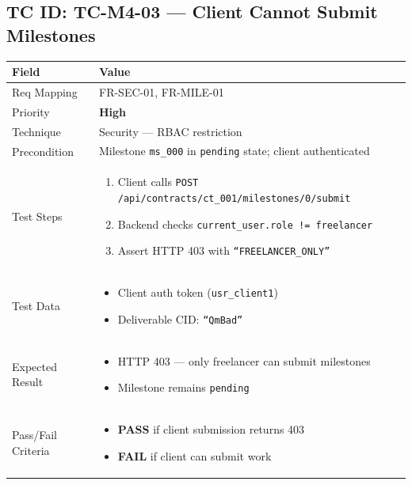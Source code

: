 \documentclass[12pt,a4paper]{article}
\newcommand{\sevhigh}{\textcolor{severityhigh}{\textbf{High}}}
\newcommand{\passresult}{\textcolor{passgreen}{\textbf{PASS}}}
\newcommand{\failresult}{\textcolor{failred}{\textbf{FAIL}}}
\begin{document}
\vspace{0.8cm}

\subsection{TC ID: TC-M4-03 --- Client Cannot Submit Milestones}

\begin{tabular}{|p{}|p{}|}
\hline
\rowcolor{lightblue} \textbf{Field} & \textbf{Value} \\
\hline
Req Mapping & FR-SEC-01, FR-MILE-01 \\
\hline
Priority & \sevhigh \\
\hline
Technique & Security --- RBAC restriction \\
\hline
Precondition & Milestone \texttt{ms\_000} in \texttt{pending} state; client authenticated \\
\hline
Test Steps &
\begin{enumerate}[nosep, leftmargin=*]
  \item Client calls \texttt{POST /api/contracts/ct\_001/milestones/0/submit}
  \item Backend checks \texttt{current\_user.role != freelancer}
  \item Assert HTTP 403 with \texttt{``FREELANCER\_ONLY''}
\end{enumerate} \\
\hline
Test Data &
\begin{itemize}[nosep, leftmargin=*]
  \item Client auth token (\texttt{usr\_client1})
  \item Deliverable CID: \texttt{``QmBad''}
\end{itemize} \\
\hline
Expected Result &
\begin{itemize}[nosep, leftmargin=*]
  \item HTTP 403 --- only freelancer can submit milestones
  \item Milestone remains \texttt{pending}
\end{itemize} \\
\hline
Pass/Fail Criteria &
\begin{itemize}[nosep, leftmargin=*]
  \item \passresult{} if client submission returns 403
  \item \failresult{} if client can submit work
\end{itemize} \\
\hline
\end{tabular}
\end{document}
